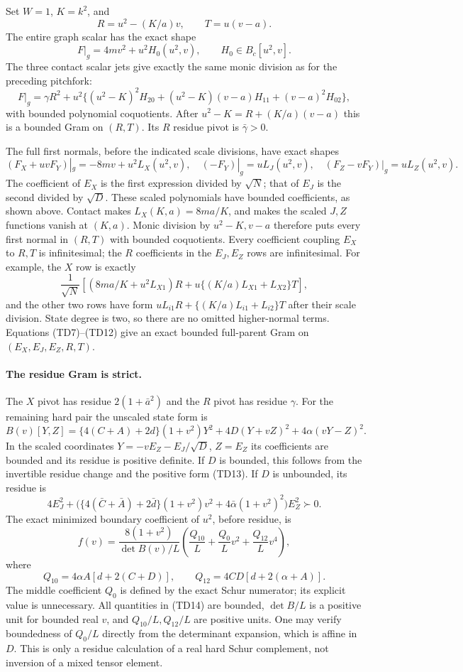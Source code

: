 Set $W=1$, $K=k^2$, and
\[
 R=u^2-(K/a)v,\qquad T=u(v-a).
\]
The entire graph scalar has the exact shape
\[
 F|_g=4mv^2+u^2H_0(u^2,v),\qquad H_0\in B_c[u^2,v].             \tag{TD9}
\]
The three contact scalar jets give exactly the same monic division
as for the preceding pitchfork:
\[
 F|_g=\gamma R^2+u^2\{(u^2-K)^2H_{20}
                   +(u^2-K)(v-a)H_{11}+(v-a)^2H_{02}\},         \tag{TD10}
\]
with bounded polynomial coquotients. After
$u^2-K=R+(K/a)(v-a)$ this is a bounded Gram on $(R,T)$.
Its $R$ residue pivot is $\bar\gamma>0$.

The full first normals, before the indicated scale divisions, have
exact shapes
\[
 (F_X+uvF_Y)|_g=-8mv+u^2L_X(u^2,v),\quad
 (-F_Y)|_g=uL_J(u^2,v),\quad
 (F_Z-vF_Y)|_g=uL_Z(u^2,v).                       \tag{TD11}
\]
The coefficient of $E_X$ is the first expression divided by
$\sqrt N$; that of $E_J$ is the second divided by $\sqrt D$.
These scaled polynomials have bounded coefficients, as shown above.
Contact makes $L_X(K,a)=8ma/K$, and makes the scaled $J,Z$ functions
vanish at $(K,a)$. Monic division by $u^2-K,v-a$ therefore puts
every first normal in $(R,T)$ with bounded coquotients.
Every coefficient coupling $E_X$ to $R,T$ is infinitesimal; the
$R$ coefficients in the $E_J,E_Z$ rows are infinitesimal.
For example, the $X$ row is exactly
\[
\frac1{\sqrt N}\left[
 (8ma/K+u^2L_{X1})R
 +u\{(K/a)L_{X1}+L_{X2}\}T\right],              \tag{TD12}
\]
and the other two rows have form
$uL_{i1}R+\{(K/a)L_{i1}+L_{i2}\}T$ after their scale division.
State degree is two, so there are no omitted higher-normal terms.
Equations (TD7)--(TD12) give an exact bounded full-parent Gram on
$(E_X,E_J,E_Z,R,T)$.

\paragraph{The residue Gram is strict.}
The $X$ pivot has residue $2(1+\bar a^2)$ and the $R$ pivot has
residue $\gamma$. For the remaining hard pair the unscaled state
form is
\[
 B(v)[Y,Z]=\{4(C+A)+2d\}(1+v^2)Y^2
           +4D(Y+vZ)^2+4\alpha(vY-Z)^2.           \tag{TD13}
\]
In the scaled coordinates $Y=-vE_Z-E_J/\sqrt D$, $Z=E_Z$ its
coefficients are bounded and its residue is positive definite.
If $D$ is bounded, this follows from the invertible residue change
and the positive form (TD13). If $D$ is unbounded, its residue is
\[
 4E_J^2+\bigl(\{4(\bar C+\bar A)+2\bar d\}(1+v^2)v^2
                  +4\bar\alpha(1+v^2)^2\bigr)E_Z^2\succ0.
\]
The exact minimized boundary coefficient of $u^2$, before residue,
is
\[
 f(v)=\frac{8(1+v^2)}{\det B(v)/L}
       \left(\frac{Q_{10}}L+\frac{Q_0}L v^2+\frac{Q_{12}}L v^4\right),
                                                               \tag{TD14}
\]
where
\[
 Q_{10}=4\alpha A[d+2(C+D)],\qquad
 Q_{12}=4CD[d+2(\alpha+A)].
\]
The middle coefficient $Q_0$ is defined by the exact Schur numerator;
its explicit value is unnecessary. All quantities in (TD14) are
bounded, $\det B/L$ is a positive unit for bounded real $v$, and
$Q_{10}/L,Q_{12}/L$ are positive units. One may verify boundedness
of $Q_0/L$ directly from the determinant expansion, which is affine
in $D$. This is only a residue calculation of a real hard Schur
complement, not inversion of a mixed tensor element.

